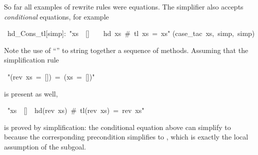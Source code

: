 \begin{isabelle}%
%
\begin{isamarkuptext}%
So far all examples of rewrite rules were equations. The simplifier also
accepts \emph{conditional} equations, for example%
\end{isamarkuptext}%
~hd\_Cons\_tl[simp]:~{"}xs~{\isasymnoteq}~[]~~{\isasymLongrightarrow}~~hd~xs~\#~tl~xs~=~xs{"}\isanewline
{}(case\_tac~xs,~simp,~simp)%
\begin{isamarkuptext}%
\noindent
Note the use of ``'' to string together a
sequence of methods. Assuming that the simplification rule%
\end{isamarkuptext}%
~{"}(rev~xs~=~[])~=~(xs~=~[]){"}%
\begin{isamarkuptext}%
\noindent
is present as well,%
\end{isamarkuptext}%
~{"}xs~{\isasymnoteq}~[]~{\isasymLongrightarrow}~hd(rev~xs)~\#~tl(rev~xs)~=~rev~xs{"}%
\begin{isamarkuptext}%
\noindent
is proved by simplification:
the conditional equation  above
can simplify  to 
because the corresponding precondition 
simplifies to , which is exactly the local
assumption of the subgoal.%
\end{isamarkuptext}%
\end{isabelle}%
